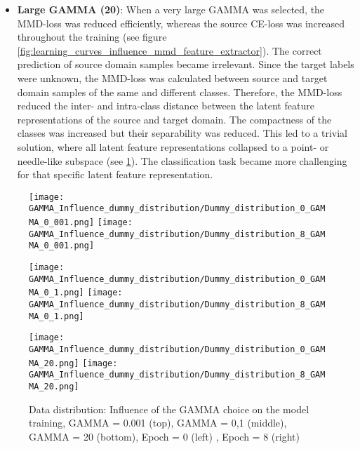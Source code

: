 \begin{itemize}
    \item \textbf{Large GAMMA (20)}:
    When a very large GAMMA was selected, the MMD-loss was reduced efficiently, whereas the source CE-loss was increased throughout the training (see figure \ref{fig:learning_curves_influence_mmd_feature_extractor}). The correct prediction of source domain samples became irrelevant. Since the target labels were unknown, the MMD-loss was calculated between source and target domain samples of the same and different classes. Therefore, the MMD-loss reduced the inter- and intra-class distance between the latent feature representations of the source and target domain. The compactness of the classes was increased but their separability was reduced. This led to a trivial solution, where all latent feature representations collapsed to a point- or needle-like subspace (see \ref{fig:point_cloud_mmd}). The classification task became more challenging for that specific latent feature representation.
\end{itemize}

\begin{figure}[H]
  \centering
  \texttt{[image: GAMMA\_Influence\_dummy\_distribution/Dummy\_distribution\_0\_GAMMA\_0\_001.png]}
  \hspace{.4cm}
  \texttt{[image: GAMMA\_Influence\_dummy\_distribution/Dummy\_distribution\_8\_GAMMA\_0\_001.png]}

  \vspace{.1cm}

  \texttt{[image: GAMMA\_Influence\_dummy\_distribution/Dummy\_distribution\_0\_GAMMA\_0\_1.png]}
  \hspace{.4cm}
  \texttt{[image: GAMMA\_Influence\_dummy\_distribution/Dummy\_distribution\_8\_GAMMA\_0\_1.png]}

  \vspace{.1cm}

  \texttt{[image: GAMMA\_Influence\_dummy\_distribution/Dummy\_distribution\_0\_GAMMA\_20.png]}
  \hspace{.4cm}
  \texttt{[image: GAMMA\_Influence\_dummy\_distribution/Dummy\_distribution\_8\_GAMMA\_20.png]}
 

  \caption{Data distribution: Influence of the GAMMA choice on the model training, GAMMA = 0.001 (top), GAMMA = 0,1 (middle), GAMMA = 20 (bottom), Epoch = 0 (left) , Epoch = 8 (right)}
  \label{fig:point_cloud_mmd}
\end{figure}


